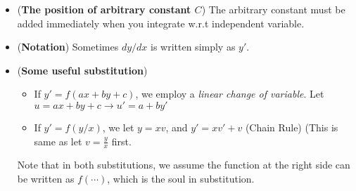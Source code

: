 \documentclass[10pt, landscape]{article}
\begin{document}
\begin{multicols}{4}
\begin{enumerate}
    \begin{itemize}
        \item (\textbf{The position of arbitrary constant $C$}) The arbitrary constant must be added immediately when you integrate w.r.t independent variable.
        \item (\textbf{Notation}) Sometimes $dy/dx$ is written simply as $y'$.
        \item (\textbf{Some useful substitution})
        \begin{itemize}
            \item If $y'=f(ax+by+c)$, we employ a \textit{linear change of variable}. Let $u=ax+by+c\rightarrow u'=a+by'$
            \item If $y'=f(y/x)$, we let $y=xv$, and $y'=xv'+v$ (Chain Rule) (This is same as let $v=\frac{y}{x}$ first.
        \end{itemize}
        Note that in both substitutions, we assume the function at the right side can be written as $f(\cdots)$, which is the soul in substitution.
    \end{itemize}
\end{enumerate}

\end{multicols}
\end{document}
